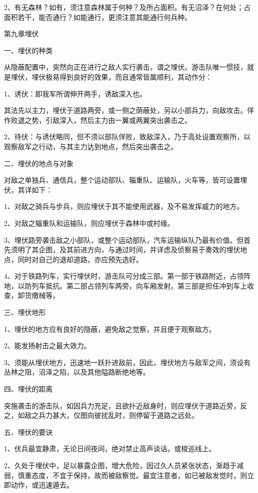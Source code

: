 2、有无森林？如有，须注意森林属于何种？及所占面积。有无沼泽？在何处；占面积若干，能否通行？如能通行，更须注意其能通行何兵种。

第九章埋伏

一、埋伏的种类

从隐蔽配置中，突然向正在进行之敌人实行袭击，谓之埋伏。游击队唯一惯技，就是埋伏，埋伏极易得到良好的效果，而且通常皆属顺利，其动作分：

1、诱伏：即我军所谓伸开两手，诱敌深入也。

其法先以主力，埋伏于道路两旁，或一侧之荫蔽处，另以小部兵力，向敌攻击。佯作败退之势，引敌深入，然后主力由一翼或两翼突出袭击之。

2、待伏：与诱伏略同，但不须以部队佯败，致敌深入，乃于高处设置观察所，以观察敌军之行动，与其主力达到地点，然后突出袭击之。

二、埋伏的地点与对象

对敌之单独兵、通信兵，整个运动部队、辎重队、运输队，火车等，皆可设置埋伏，其详如下：

1、对敌之骑兵与步兵，则应埋伏于其不能使用武器，及不易发挥威力的地方。

2、对敌之辎重队和运输队，则应埋伏于森林中或村缘。

3、埋伏路旁袭击敌之小部队，或整个运动部队，汽车运输纵队乃最有价值。但首先须明了其企图，及其前进方向，与通过时间，并详虑及侦察易于奏效的埋伏地点，同时对自己的退却道路，亦应预先选好。

4、对于铁路列车，实行埋伏时，游击队可分成三部。第一部于铁路附近，占领阵地，以防列车抵抗。第二部占领列车两旁，向车厢发射。第三部是担任冲到车上收查，卸货缴械等。

三、埋伏地形

1、埋伏的地方应有良好的隐蔽，避免敌之觉察，并且便于观察敌方。

2、能发扬射击之最大效力。

3、须能从埋伏地方，迅速地一跃扑进敌前，因此，埋伏地方与敌军之间，须设有丛林之阻，沼泽之陷，以及其他隘路断绝地等。

四、埋伏的距离

突施袭击的游击队，如因兵力充足，且欲扑近敌身时，则应埋伏于道路近旁，反之，如敌之兵力甚大，仅图向彼扰乱时，则停留于道路之远处。

五、埋伏的要诀

1、伏兵最宜静肃，无论日间夜间，绝对禁止高声谈话，或梭巡线上。

2、久处于埋伏中，足以暴露企图，增大危险，因过久人员紧张状态，渐趋于减弱，慎重态度，不宜于保持，故而被敌察觉。最宜注意者，如已被敌发觉时，则立即动作，或迅速遁去。


